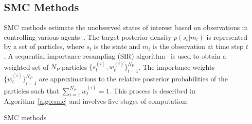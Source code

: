 \subsection{SMC Methods}
\label{sec:smc}

SMC methods estimate the unobserved states of interest based on observations in controlling various agents~\cite{doucet01}.
The target posterior density $p(s_t|m_t)$ is represented by a set of particles, where $s_t$ is the state and $m_t$ is the observation at time step $t$.
A sequential importance resampling (SIR) algorithm~\cite{gordon93} is used to obtain a weighted set of $N_P$ particles $\{s_t^{(i)},w_t^{(i)}\}^{N_P}_{i=1}$.
The importance weights $\{w_t^{(i)}\}^{N_P}_{i=1}$ are approximations to the relative posterior probabilities of the particles such that $\sum^{N_P}_{i=1}w^{(i)}_t = 1$.
This process is described in Algorithm~\ref{algo:smc} and involves five stages of computation:

\begin{algorithm}
\caption{SMC methods}
\footnotesize
\begin{algorithmic}[1]
			 \label{algo:s}
			 \label{algo:i}
		\ENDWHILE
	\ENDFOR
	\ENDIF
\ENDWHILE
{}
\ENDFOR
\end{algorithmic}
\label{algo:smc}
\end{algorithm}


